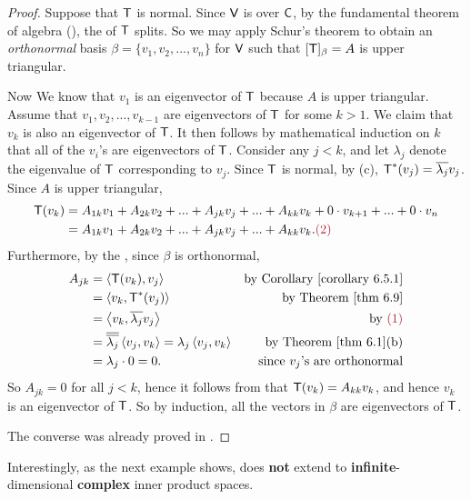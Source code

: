 \begin{proof}
Suppose that \(\textsf{T}\) is normal.
Since \(\textsf{V}\) is over \(\textsf{C}\), by the fundamental theorem of algebra (), the \CPOLY{} of \(\textsf{T}\) splits.
So we may apply Schur's theorem  to obtain an \emph{orthonormal} basis \(\beta = \{ v_1, v_2, ..., v_n \}\) for \(\textsf{V}\) such that \([\textsf{T}]_{\beta} = A\) is upper triangular.

Now We know that \(v_1\) is an eigenvector of \(\textsf{T}\) because \(A\) is upper triangular.
Assume that \(v_1, v_2, ..., v_{k - 1}\) are eigenvectors of \(\textsf{T}\) for some \(k > 1\).
We claim that \(v_k\) is also an eigenvector of \(\textsf{T}\).
It then follows by mathematical induction on \(k\) that all of the \(v_i\)'s are eigenvectors of \(\textsf{T}\).
Consider any \(j < k\), and let \(\lambda_j\) denote the eigenvalue of \(\textsf{T}\) corresponding to \(v_j\).
Since \(\textsf{T}\) is normal, by (c), \(\textsf{T}^*(v_j) = \overline{\lambda_j} v_j\). 
Since \(A\) is upper triangular,
\begin{align*}
    \T(v_k) & = A_{1k} v_1 + A_{2k} v_2 + ... + A_{jk} v_j + ... + A_{kk}v_k + 0 \cdot v_{k + 1} + ... + 0 \cdot v_{n} \\
    & = A_{1k} v_1 + A_{2k} v_2 + ... + A_{jk} v_j + ... + A_{kk}v_k. \MAROON{(2)}
\end{align*}
Furthermore, by the , since \(\beta\) is orthonormal,
\begin{align*}
    A_{jk} & = \LG \T(v_k), v_j \RG & \text{by \CORO{6.5.1}} \\
        & = \LG v_k, \T^*(v_j) \RG & \text{by \THM{6.9}} \\
        & = \LG v_k, \conjugatet{\lambda_j} v_j \RG & \text{by \MAROON{(1)}} \\
        & = \conjugatet{\conjugatet{\lambda_j}} \LG v_j, v_k \RG = \lambda_j \LG v_j, v_k \RG & \text{by \THM{6.1}(b)} \\
        & = \lambda_j \cdot 0 = 0. & \text{since \(v_j\)'s are orthonormal}
\end{align*}
So \(A_{jk} = 0\) for all \(j < k\), hence it follows from  that \(\textsf{T}(v_k) = A_{kk} v_k\), and hence \(v_k\) is an eigenvector of \(\textsf{T}\).
So by induction, all the vectors in \(\beta\) are eigenvectors of \(\textsf{T}\).

The converse was already proved in .
\end{proof}

\begin{remark} \label{remark 6.4.4}
Interestingly, as the next example shows,  does \textbf{not} extend to \textbf{infinite}-dimensional \textbf{complex} inner product spaces.
\end{remark}

